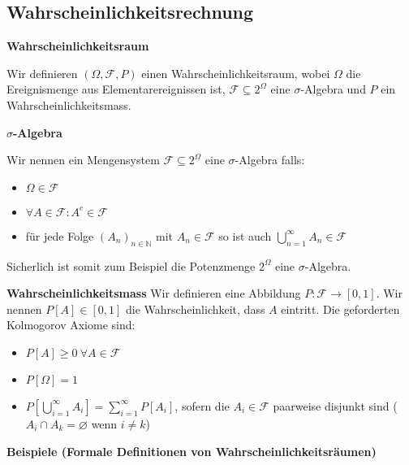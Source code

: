 \documentclass[25pt]{sciposter}
\newcommand{\N}{\mathbb{N}}
\newcommand{\F}{\mathcal{F}}
\newenvironment{method}[1]{\begin{mdframed}[backgroundcolor=blue!10,innertopmargin=15pt, innerbottommargin=15pt,nobreak=true]
		\textbf{#1 }
	}
	{ 
	\end{mdframed}
}
\begin{document}
\begin{multicols}{3}
	
	
	
	
	
	
	
	
	
	
	
	
		\section{Wahrscheinlichkeitsrechnung}
		
		\begin{method}{Wahrscheinlichkeitsraum}
			Wir definieren $(\Omega, \mathcal{F}, P)$ einen Wahrscheinlichkeitsraum, wobei $\Omega$ die Ereignismenge aus Elementarereignissen ist, $\F \subseteq 2^\Omega$ eine $\sigma$-Algebra und $P$ ein Wahrscheinlichkeitsmass.
		\end{method}
		
		\begin{method}{$\sigma$-Algebra}
			Wir nennen ein Mengensystem $\F\subseteq 2^\Omega$ eine $\sigma$-Algebra falls:
			\begin{itemize}
				\item $\Omega \in \F$
				\item $\forall A \in \F : A^c \in \F$
				\item für jede Folge $(A_n)_{n\in\N}$ mit $A_n \in \F$ so ist auch $\bigcup_{n=1}^\infty A_n \in \F $
			\end{itemize}
			
			Sicherlich ist somit zum Beispiel die Potenzmenge $2^\Omega$ eine $\sigma$-Algebra.
		\end{method}
		
		\begin{method}{Wahrscheinlichkeitsmass} Wir definieren eine Abbildung $P: \F \to [0,1]$. Wir nennen $P[A]\in[0,1]$ die Wahrscheinlichkeit, dass $A$ eintritt. Die geforderten Kolmogorov Axiome sind:
			\begin{itemize}
				\item $P[A]\geq 0 \ \forall A \in \F$
				\item $P[\Omega] = 1$
				\item $P\left[ \bigcup_{i=1}^{\infty} A_i \right] = \sum_{i=1}^{\infty}P[A_i]$, sofern die $A_i \in \F$ paarweise disjunkt sind ($A_i \cap A_k = \varnothing$ wenn $i \neq k$) 
			\end{itemize}
		\end{method}
		
		\textbf{Beispiele (Formale Definitionen von Wahrscheinlichkeitsräumen)}
		

\end{multicols}
\end{document}
